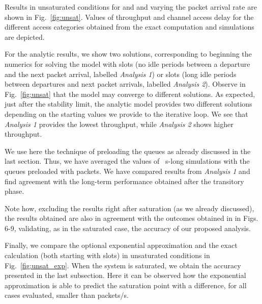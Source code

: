 \documentclass[preprint,12pt]{elsarticle}
\begin{document}
Results in unsaturated conditions for  and  and varying the packet arrival rate  are shown in Fig.~\ref{fig:unsat}. Values of throughput and channel access delay for the different access categories obtained from the exact computation and simulations are depicted. 

For the analytic results, we show two solutions, corresponding to beginning the numerics for solving the model with  slots (no idle periods between a departure and the next packet arrival, labelled \emph{Analysis 1}) or  slots (long idle periods between departures and next packet arrivals, labelled \emph{Analysis 2}). Observe in Fig.~\ref{fig:unsat} that the model may converge to different solutions. As expected, just after the stability limit, the analytic model provides two different solutions depending on the starting values we provide to the iterative loop. We see that \emph{Analysis 1} provides the lowest throughput, while \emph{Analysis 2} shows higher throughput.

We use here the technique of preloading the queues as already discussed in the last section. Thus, we have averaged the values of ~s-long simulations with the queues preloaded with  packets. We have compared results from \emph{Analysis 1} and find agreement with the long-term performance obtained after the transitory phase. 

Note how, excluding the results right after saturation (as we already discussed), the results obtained are also in agreement with the outcomes obtained in \cite{chung2006performance} in Figs. 6-9, validating, as in the saturated case, the accuracy of our proposed analysis.

Finally, we compare the optional exponential approximation and the exact calculation (both starting with  slots) in unsaturated conditions in Fig.~\ref{fig:unsat_exp}. When the system is saturated, we obtain the accuracy presented in the last subsection. Here it can be observed how the exponential approximation is able to predict the saturation point with a difference, for all cases evaluated, smaller than  packets/s.

\begin{figure*}[!tb]
\centering
{}
\\
\caption{Performance results in unsaturated conditions. Comparison among the exact analysis and the exponential approximation to .}
\label{fig:unsat_exp}
\end{figure*}
\end{document}

